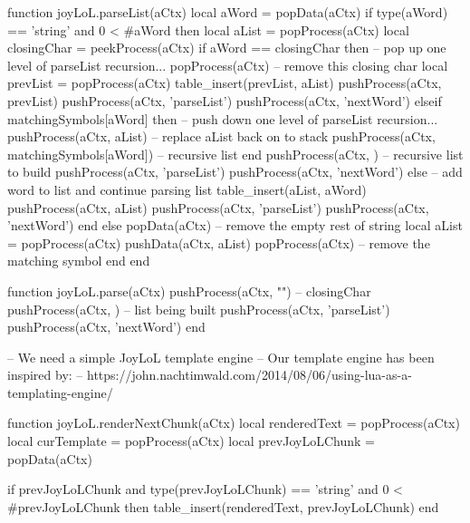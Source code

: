 function joyLoL.parseList(aCtx)
  local aWord = popData(aCtx)
  if type(aWord) == 'string' and 0 < #aWord then
    local aList = popProcess(aCtx)
    local closingChar = peekProcess(aCtx)
    if aWord == closingChar then
      -- pop up one level of parseList recursion...
      popProcess(aCtx)       -- remove this closing char
      local prevList = popProcess(aCtx)
      table_insert(prevList, aList)
      pushProcess(aCtx, prevList)
      pushProcess(aCtx, 'parseList')
      pushProcess(aCtx, 'nextWord')
    elseif matchingSymbols[aWord] then
      -- push down one level of parseList recursion...
      pushProcess(aCtx, aList) -- replace aList back on to stack
      pushProcess(aCtx, matchingSymbols[aWord]) -- recursive list end
      pushProcess(aCtx, {})                     -- recursive list to build
      pushProcess(aCtx, 'parseList')
      pushProcess(aCtx, 'nextWord')
    else
      -- add word to list and continue parsing list
      table_insert(aList, aWord)
      pushProcess(aCtx, aList)
      pushProcess(aCtx, 'parseList')
      pushProcess(aCtx, 'nextWord')
    end
  else
    popData(aCtx) -- remove the empty rest of string
    local aList = popProcess(aCtx)
    pushData(aCtx, aList)
    popProcess(aCtx) -- remove the matching symbol
  end
end

function joyLoL.parse(aCtx)
  pushProcess(aCtx, "")  -- closingChar
  pushProcess(aCtx, {}) -- list being built
  pushProcess(aCtx, 'parseList')
  pushProcess(aCtx, 'nextWord')
end

-- We need a simple JoyLoL template engine
-- Our template engine has been inspired by:
--   https://john.nachtimwald.com/2014/08/06/using-lua-as-a-templating-engine/

function joyLoL.renderNextChunk(aCtx)
  local renderedText    = popProcess(aCtx)
  local curTemplate     = popProcess(aCtx)
  local prevJoyLoLChunk = popData(aCtx)
  
  if prevJoyLoLChunk
    and type(prevJoyLoLChunk) == 'string'
    and 0 < #prevJoyLoLChunk then
    table_insert(renderedText, prevJoyLoLChunk)
  end
  
